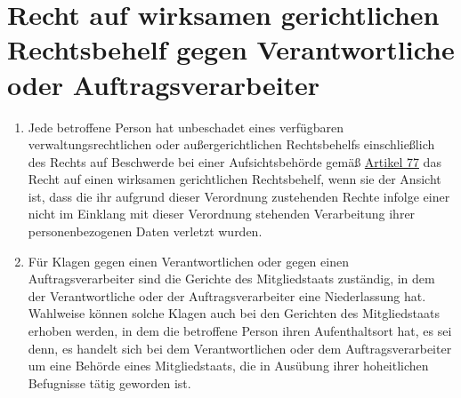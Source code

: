 \chapter{Recht auf wirksamen gerichtlichen Rechtsbehelf gegen Verantwortliche oder Auftragsverarbeiter}
\label{ch:79}


\begin{enumerate}

  \item Jede betroffene Person hat unbeschadet eines verfügbaren verwaltungsrechtlichen oder außergerichtlichen
   Rechtsbehelfs einschließlich des Rechts auf Beschwerde bei einer Aufsichtsbehörde gemäß \hyperref[ch:77]{Artikel 77}
   das Recht auf einen wirksamen gerichtlichen Rechtsbehelf, wenn sie der Ansicht ist, dass die ihr aufgrund dieser
   Verordnung zustehenden Rechte infolge einer nicht im Einklang mit dieser Verordnung stehenden Verarbeitung ihrer
   personenbezogenen Daten verletzt wurden.
  \label{itm:79-1}

  \item Für Klagen gegen einen Verantwortlichen oder gegen einen Auftragsverarbeiter sind die Gerichte des
   Mitgliedstaats zuständig, in dem der Verantwortliche oder der Auftragsverarbeiter eine Niederlassung hat. Wahlweise
   können solche Klagen auch bei den Gerichten des Mitgliedstaats erhoben werden, in dem die betroffene Person ihren
   Aufenthaltsort hat, es sei denn, es handelt sich bei dem Verantwortlichen oder dem Auftragsverarbeiter um eine
   Behörde eines Mitgliedstaats, die in Ausübung ihrer hoheitlichen Befugnisse tätig geworden ist.
  \label{itm:79-2}

\end{enumerate}



